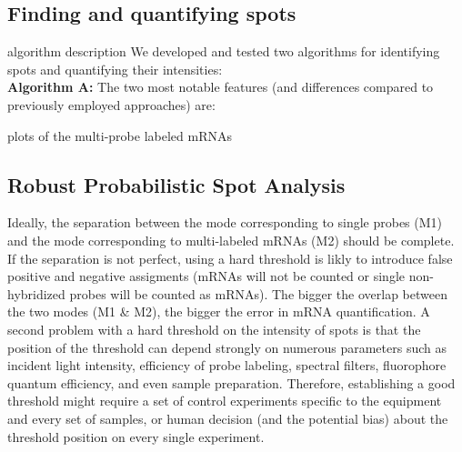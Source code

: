 \documentclass[10pt]{article}
\begin{document}
\begin{spacing}{1.5}
\subsection*{Finding and quantifying spots}
algorithm description 
We developed and tested two algorithms for identifying spots and quantifying their intensities: \\
\textbf{Algorithm A:} The two most notable features (and differences compared to previously employed approaches) are:

plots of the multi-probe labeled mRNAs

\subsection*{Robust Probabilistic Spot Analysis}
Ideally, the separation between the mode corresponding to single probes (M1) and the mode corresponding to multi-labeled mRNAs (M2) should be complete. If the separation is not perfect, using a hard threshold is likly to introduce false positive and negative assigments (mRNAs will not be counted or single non-hybridized probes will be counted as mRNAs). The bigger the overlap between the two modes (M1 \& M2), the bigger the error in mRNA quantification. A second problem with a hard threshold on the intensity of spots is that the position of the threshold can depend  strongly on numerous parameters such as incident light intensity, efficiency of probe labeling, spectral filters, fluorophore quantum efficiency, and even sample preparation. Therefore, establishing a good threshold might require a set of control experiments specific to the equipment and  every set of samples, or human decision (and the potential bias) about the threshold position on every single experiment. \\


\end{spacing}
\end{document}
